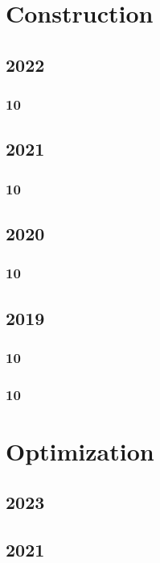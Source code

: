 \documentclass[11pt]{book}
\begin{document}
\chapter{Construction}

\section{2022}
\subsection{10}

\section{2021}
\subsection{10}

\section{2020}
\subsection{10}

\section{2019} 
\subsection{10}

\subsection{10}




\chapter{Optimization}
\section{2023}

\section{2021}
\end{document}
